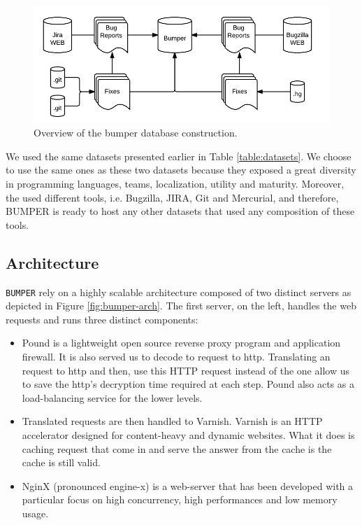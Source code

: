 \begin{figure}[h!]
  \centering
    \includegraphics{media/bumper-approach.png}
    \caption{Overview of the bumper database construction.
    \label{fig:bumper-approach}}
\end{figure}

We used the same datasets presented earlier in Table \ref{table:datasets}.
We choose to use the same ones as these two datasets because they exposed a great diversity in programming languages, teams, localization, utility and maturity. Moreover, the used different tools, i.e. Bugzilla, JIRA, Git and Mercurial, and therefore, BUMPER is ready to host any other datasets that used any composition of these tools.

\subsection{Architecture}

{\tt BUMPER} rely on a highly scalable architecture composed of two distinct servers as depicted in Figure \ref{fig:bumper-arch}. The first server, on the left, handles the web requests and runs three distinct components:

\begin{itemize}
	\item Pound is a lightweight open source reverse proxy program and application firewall.
	It is also served us to decode  to request to http. Translating an  request to http and then, use this HTTP request instead of the  one allow us to save the http's decryption time required at each step.
	Pound also acts as a load-balancing service for the lower levels.
	\item Translated requests are then handled to Varnish. Varnish is an HTTP accelerator designed for content-heavy and dynamic websites. What it does is caching request that come in and serve the answer from the cache is the cache is still valid.
	\item NginX (pronounced engine-x) is a web-server that has been developed with a particular focus on high concurrency, high performances and low memory usage.
\end{itemize}

